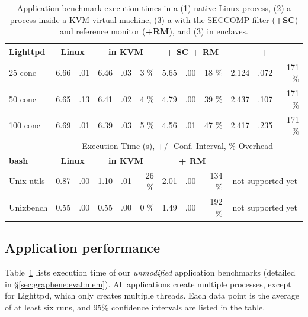 \begin{table}[t!b!]
\begin{tabular}{|l|rr|rrr|rrr|rrr|}
{\bf Lighttpd} & \multicolumn{2}{c|}{\bf Linux} & \multicolumn{3}{c|}{{\bf in KVM}} & \multicolumn{3}{c|}{{\bf \graphene{} + SC + RM}} & \multicolumn{3}{c|}{{\bf \graphene{} + \sgx{}}} \\
\hline

25 conc    & 6.66 &.01 &6.46 &.03 &3 \% &5.65 &.00 &18 \% & 2.124 & .072 & 171 \%    \\\hline
50 conc    & 6.65 &.13 &6.41 &.02 &4 \% &4.79 &.00 &39 \% & 2.437 & .107 & 171 \%    \\\hline
100 conc   & 6.69 &.01 &6.39 &.03 &5 \% &4.56 &.01 &47 \% & 2.417 & .235 & 171 \%    \\\hline

\hline\hline

  & \multicolumn{11}{c|}{Execution Time (s), +/- Conf. Interval, \% Overhead} \\
\hline
{\bf bash } & \multicolumn{2}{c|}{\bf Linux} & \multicolumn{3}{c|}{{\bf in KVM}} & \multicolumn{3}{c|}{{\bf \graphene{} + RM}} & \multicolumn{3}{c|}{{\bf \graphenesgx{}}} \\
\hline

Unix utils & 0.87 & .00 & 1.10 & .01 & 26 \% & 2.01 & .00 & 134 \% & \multicolumn{3}{c|}{not supported yet} \\\hline
Unixbench  & 0.55 & .00 & 0.55 & .00 &  0 \% & 1.49 & .00 & 192 \% & \multicolumn{3}{c|}{not supported yet} \\\hline
\end{tabular}
\caption[Application benchmark results in Linux, KVM and \graphene{}]
{Application benchmark execution times in a (1) native Linux process, (2) a process inside a KVM virtual machine, (3) a \graphene{} \picoproc{} with the SECCOMP filter ({\bf +SC}) and reference monitor ({\bf +RM}), and (3) \graphene{} in \sgx{} enclaves. }
\label{tab:graphene:apps}
\end{table}


\subsection{Application performance}
\label{sec:graphene:eval:perf}

Table~\ref{tab:graphene:apps} lists 
execution time of our {\em unmodified} 
application benchmarks (detailed in \S\ref{sec:graphene:eval:mem}).
All applications create multiple processes,
except for Lighttpd, which only creates multiple threads.
Each data point is the average of at least six runs, 
and 95\% confidence intervals are listed in the table.

